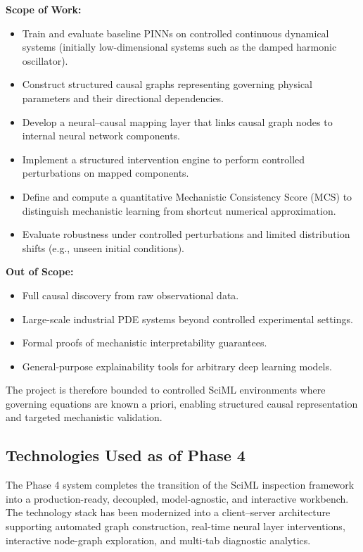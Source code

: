\documentclass[12pt,singleside,a4paper]{article}
\begin{document}
\textbf{Scope of Work:}
\begin{itemize}
    \item Train and evaluate baseline PINNs on controlled continuous dynamical systems (initially low-dimensional systems such as the damped harmonic oscillator).
    \item Construct structured causal graphs representing governing physical parameters and their directional dependencies.
    \item Develop a neural--causal mapping layer that links causal graph nodes to internal neural network components.
    \item Implement a structured intervention engine to perform controlled perturbations on mapped components.
    \item Define and compute a quantitative Mechanistic Consistency Score (MCS) to distinguish mechanistic learning from shortcut numerical approximation.
    \item Evaluate robustness under controlled perturbations and limited distribution shifts (e.g., unseen initial conditions).
\end{itemize}

\textbf{Out of Scope:}
\begin{itemize}
    \item Full causal discovery from raw observational data.
    \item Large-scale industrial PDE systems beyond controlled experimental settings.
    \item Formal proofs of mechanistic interpretability guarantees.
    \item General-purpose explainability tools for arbitrary deep learning models.
\end{itemize}

The project is therefore bounded to controlled SciML environments where governing equations are known a priori, enabling structured causal representation and targeted mechanistic validation.
\subsection{Technologies Used as of Phase 4}

The Phase 4 system completes the transition of the SciML inspection framework into a production-ready, decoupled, model-agnostic, and interactive workbench. The technology stack has been modernized into a client--server architecture supporting automated graph construction, real-time neural layer interventions, interactive node-graph exploration, and multi-tab diagnostic analytics.
\end{document}
